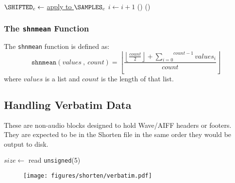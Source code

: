 {\begin{algorithm}[H]
{{        $\text{\SHIFTED}_c \leftarrow$ \hyperref[shorten:apply_leftshift]{apply \LEFTSHIFT to $\text{\SAMPLES}_c$}\;
        $i \leftarrow i + 1$\;
      }(){
      }
    }()
  \end{algorithm}
}

\clearpage

\subsubsection{The \texttt{shnmean} Function}
\label{shorten:shnmean}
The \texttt{shnmean} function is defined as:
\begin{equation*}
  \texttt{shnmean}(values~,~count) =
  \left\lfloor
  \frac{\left\lfloor\frac{count}{2}\right\rfloor +
    \overset{count - 1}{\underset{i = 0}{\sum}}{values}_i }{count}
  \right\rfloor
\end{equation*}
where $values$ is a list and $count$ is the length of that list.


\subsection{Handling Verbatim Data}
\label{shorten:read_verbatim}
These are non-audio blocks designed to hold Wave/AIFF headers or footers.
They are expected to be in the Shorten file in the same order
they would be output to disk.
\par
\noindent
{}
$size \leftarrow$ read \texttt{unsigned}(5)\;
\Return \BYTES\;
\EALGORITHM
\begin{figure}[h]
\texttt{[image: figures/shorten/verbatim.pdf]}
\end{figure}

